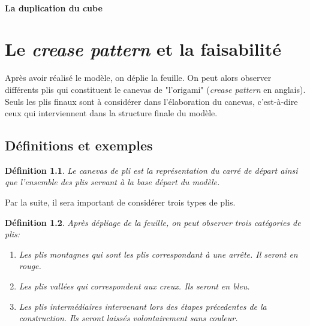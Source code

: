 \documentclass[a4paper,12pt,french]{report}
\newtheorem{definition}{Définition}[section]
\begin{document}
		
		\subsubsection{La duplication du cube}









	
\chapter{Le \emph{crease pattern} et la faisabilité}

Après avoir réalisé le modèle, on déplie la feuille. On peut alors 
observer différents plis qui constituent le canevas de 
"l'origami" (\emph{crease pattern} en anglais). Seuls les plis finaux 
sont à considérer dans l'élaboration du 
canevas, c'est-à-dire ceux qui interviennent dans la structure finale 
du modèle. 


	\section{Définitions et exemples}
 
    \begin{definition} 
      
      Le canevas de pli est la représentation du carré de départ ainsi que l'ensemble des plis 
      servant à la base départ du modèle.
      
    \end{definition}
    
    Par la suite, il sera important de considérer trois types de plis.
    
      \begin{definition}
      
        Après dépliage de la feuille, on peut observer trois 
        catégories de plis:
        
        \begin{enumerate}
        
          \item Les plis \emph{montagnes} qui sont les plis correspondant à 
          une arrête. Il seront en rouge.
          \item Les plis \emph{vallées} qui correspondent aux creux. Ils 
          seront en bleu.
          \item Les plis intermédiaires intervenant lors des étapes 
          précedentes de la construction. Ils seront laissés 
          volontairement sans couleur.
        
        \end{enumerate}
      
      \end{definition}
    
\end{document}
